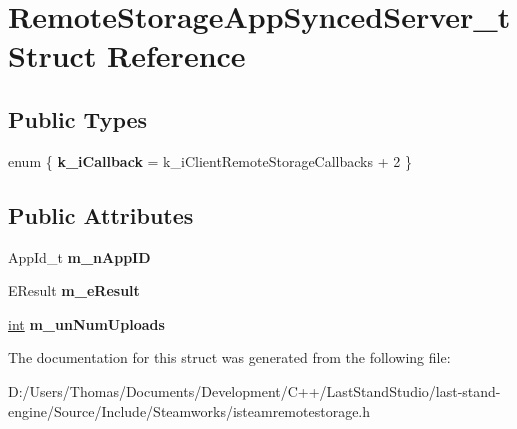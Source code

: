 \hypertarget{structRemoteStorageAppSyncedServer__t}{}\section{Remote\+Storage\+App\+Synced\+Server\+\_\+t Struct Reference}
\label{structRemoteStorageAppSyncedServer__t}
\subsection*{Public Types}
\begin{DoxyCompactItemize}
\item 
\hypertarget{structRemoteStorageAppSyncedServer__t_af11cc26bcfd30fee291f4b8436f2dbe6}{}enum \{ {\bfseries k\+\_\+i\+Callback} = k\+\_\+i\+Client\+Remote\+Storage\+Callbacks + 2
 \}\label{structRemoteStorageAppSyncedServer__t_af11cc26bcfd30fee291f4b8436f2dbe6}

\end{DoxyCompactItemize}
\subsection*{Public Attributes}
\begin{DoxyCompactItemize}
\item 
\hypertarget{structRemoteStorageAppSyncedServer__t_ad8fc7b2e71a87d55da5c3cf6a361808e}{}App\+Id\+\_\+t {\bfseries m\+\_\+n\+App\+I\+D}\label{structRemoteStorageAppSyncedServer__t_ad8fc7b2e71a87d55da5c3cf6a361808e}

\item 
\hypertarget{structRemoteStorageAppSyncedServer__t_a18d51136d61e5963cf44ae6fde021f59}{}E\+Result {\bfseries m\+\_\+e\+Result}\label{structRemoteStorageAppSyncedServer__t_a18d51136d61e5963cf44ae6fde021f59}

\item 
\hypertarget{structRemoteStorageAppSyncedServer__t_ac6ba06790bf95368ec6a4a988b14b8cb}{}\hyperlink{SDL__thread_8h_a6a64f9be4433e4de6e2f2f548cf3c08e}{int} {\bfseries m\+\_\+un\+Num\+Uploads}\label{structRemoteStorageAppSyncedServer__t_ac6ba06790bf95368ec6a4a988b14b8cb}

\end{DoxyCompactItemize}


The documentation for this struct was generated from the following file\+:\begin{DoxyCompactItemize}
\item 
D\+:/\+Users/\+Thomas/\+Documents/\+Development/\+C++/\+Last\+Stand\+Studio/last-\/stand-\/engine/\+Source/\+Include/\+Steamworks/isteamremotestorage.\+h\end{DoxyCompactItemize}
